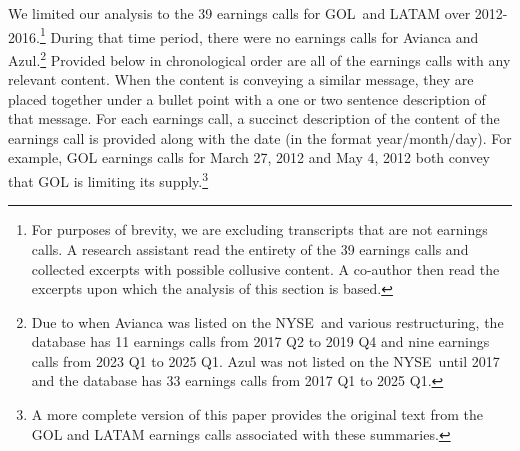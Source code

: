 We limited our analysis to the 39 earnings calls for GOL\ and LATAM over
2012-2016.\footnote{%
For purposes of brevity, we are excluding transcripts that are not earnings
calls. A research assistant read the entirety of the 39 earnings
calls and collected excerpts with possible collusive content. A co-author
then read the excerpts upon which the analysis of this
section is based.} During that time period, there were no earnings calls for
Avianca and Azul.\footnote{%
Due to when Avianca was listed on the NYSE\ and various restructuring, the
database has 11 earnings calls from 2017 Q2 to 2019 Q4 and nine earnings
calls from 2023 Q1 to 2025 Q1. Azul was not listed on the NYSE\ until 2017
and the database has 33 earnings calls from 2017 Q1 to 2025 Q1.} Provided
below in chronological order are all of the earnings calls with any relevant
content. When the content is conveying a similar message, they are placed
together under a bullet point with a one or two sentence description of that
message. For each earnings call, a succinct description of the content of
the earnings call is provided along with the date (in the format
year/month/day). For example, GOL earnings calls for March 27, 2012 and May
4, 2012 both convey that GOL is limiting its supply.\footnote{A more complete version of this paper provides the original text from the GOL and LATAM earnings calls associated with these summaries.}

